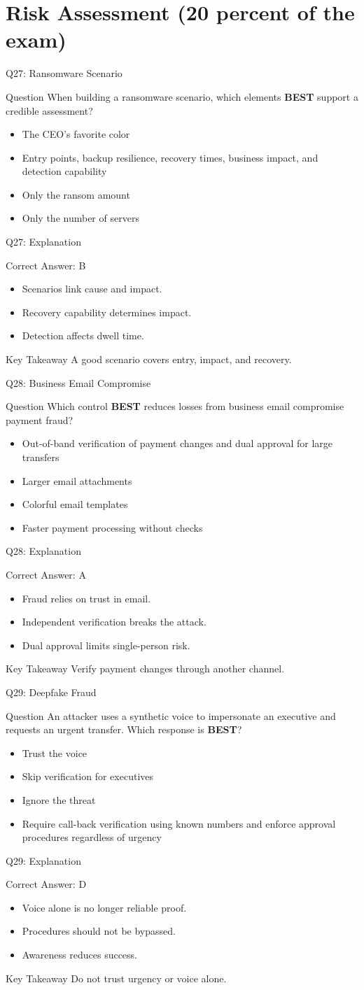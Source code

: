 \documentclass[aspectratio=169]{beamer}
\newcommand{\hq}[7]{%
	\begin{frame}{Q#1: #2}
		\begin{block}{Question}
			#3
		\end{block}
		\begin{itemize}
			#4
		\end{itemize}
	\end{frame}
	\begin{frame}{Q#1: Explanation}
		\begin{block}{Correct Answer: #5}
			\begin{itemize}
				#6
			\end{itemize}
		\end{block}
		\begin{alertblock}{Key Takeaway}
			#7
		\end{alertblock}
	\end{frame}
}
\begin{document}
	\section{Risk Assessment (20 percent of the exam)}

	\hq{27}{Ransomware Scenario}
	{When building a ransomware scenario, which elements \textbf{BEST} support a credible assessment?}
	{\item[\textbf{(A)}] The CEO's favorite color
		\item[\textbf{(B)}] Entry points, backup resilience, recovery times, business impact, and detection capability
		\item[\textbf{(C)}] Only the ransom amount
		\item[\textbf{(D)}] Only the number of servers}
	{B}
	{\item Scenarios link cause and impact.
		\item Recovery capability determines impact.
		\item Detection affects dwell time.}
	{A good scenario covers entry, impact, and recovery.}

	\hq{28}{Business Email Compromise}
	{Which control \textbf{BEST} reduces losses from business email compromise payment fraud?}
	{\item[\textbf{(A)}] Out-of-band verification of payment changes and dual approval for large transfers
		\item[\textbf{(B)}] Larger email attachments
		\item[\textbf{(C)}] Colorful email templates
		\item[\textbf{(D)}] Faster payment processing without checks}
	{A}
	{\item Fraud relies on trust in email.
		\item Independent verification breaks the attack.
		\item Dual approval limits single-person risk.}
	{Verify payment changes through another channel.}

	\hq{29}{Deepfake Fraud}
	{An attacker uses a synthetic voice to impersonate an executive and requests an urgent transfer. Which response is \textbf{BEST}?}
	{\item[\textbf{(A)}] Trust the voice
		\item[\textbf{(B)}] Skip verification for executives
		\item[\textbf{(C)}] Ignore the threat
		\item[\textbf{(D)}] Require call-back verification using known numbers and enforce approval procedures regardless of urgency}
	{D}
	{\item Voice alone is no longer reliable proof.
		\item Procedures should not be bypassed.
		\item Awareness reduces success.}
	{Do not trust urgency or voice alone.}
\end{document}
